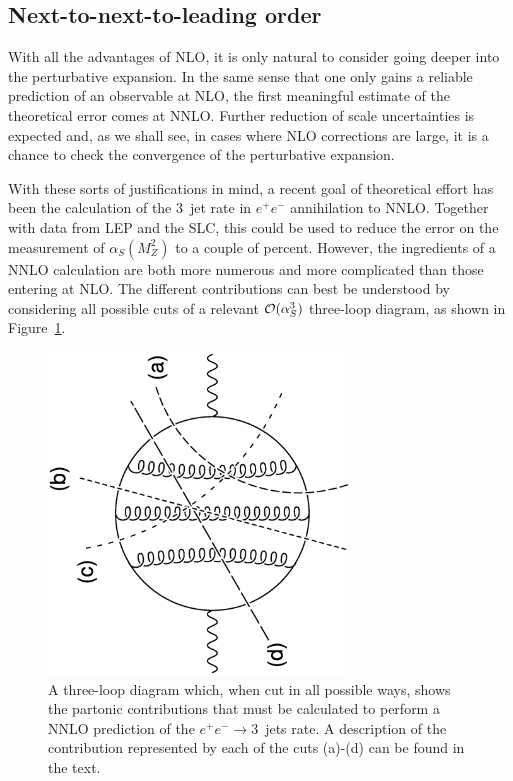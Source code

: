 \documentclass[12pt]{iopart}
\def\as{\alpha_S}
\begin{document}
\subsection{Next-to-next-to-leading order}
\label{sec:nnlo}

With all the advantages of NLO, it is only natural to consider going deeper into
the perturbative expansion. In the same sense that one only gains a reliable prediction
of an observable at NLO, the first meaningful estimate of the theoretical error
comes at NNLO. Further reduction of scale uncertainties is expected and, as we shall see,
in cases where NLO corrections are large, it is a chance to check the convergence of the
perturbative expansion.

With these sorts of justifications in mind, a recent goal of theoretical effort
has been the calculation of the $3$~jet rate in $e^+e^-$ annihilation to NNLO.
Together with data from LEP and the SLC, this could be used to reduce the error on
the measurement of $\as(M_Z^2)$ to a couple of percent. However, the
ingredients of a NNLO calculation are both more numerous and more complicated than
those entering at NLO. The different contributions can best be understood by
considering all possible cuts of a relevant ${\cal O}(\as^3)$ three-loop
diagram, as shown in Figure~\ref{fig:nnlocuts}.
%
\begin{figure}[t]
\begin{center}
\includegraphics[width=8cm,angle=-90]{nnlocuts.eps}
\end{center}
\caption{A three-loop diagram which, when cut in all possible ways, shows
the partonic contributions that must be calculated to perform a NNLO prediction
of the $e^+ e^- \to 3$~jets rate. A description of the contribution represented
by each of the cuts (a)-(d) can be found in the text.}
\label{fig:nnlocuts}
\end{figure}
%
\end{document}
